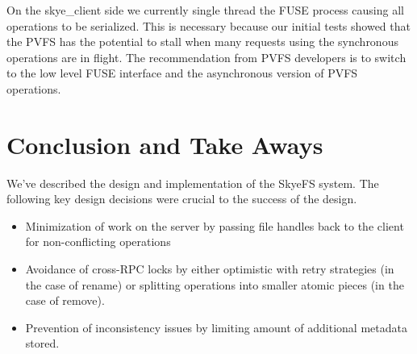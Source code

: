 \documentclass[letterpaper]{article}
\begin{document}
On the skye\_\-client side we currently single thread the FUSE process causing all
operations to be serialized.  This is necessary because our initial tests
showed that the PVFS has the potential to stall when many requests using the
synchronous operations are in flight.  The recommendation from PVFS developers is
to switch to the low level FUSE interface and the asynchronous version of PVFS
operations.


\section{Conclusion and Take Aways}
We've described the design and implementation of the SkyeFS system.  The
following key design decisions were crucial to the success of the design.

\begin{itemize}
\item Minimization of work on the server by passing file handles back to the client
for non-conflicting operations
\item Avoidance of cross-RPC locks by either optimistic with retry strategies (in
the case of rename) or splitting operations into smaller atomic pieces (in the
case of remove).
\item Prevention of inconsistency issues by limiting amount of additional metadata
stored.
\end{itemize}
\end{document}
